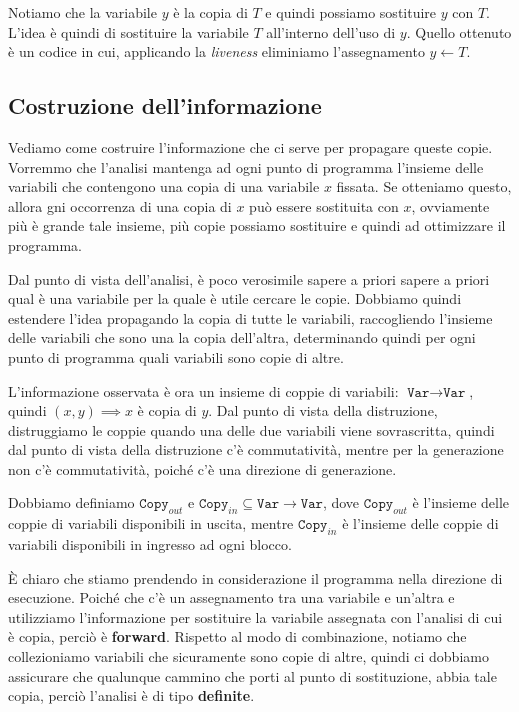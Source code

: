 Notiamo che la variabile $y$ è la copia di $T$ e quindi possiamo sostituire $y$ con $T$.
L'idea è quindi di sostituire la variabile $T$ all'interno dell'uso di $y$. Quello ottenuto 
è un codice in cui, applicando la \textit{liveness} eliminiamo l'assegnamento $y \gets T$.
\subsection{Costruzione dell'informazione}
Vediamo come costruire l'informazione che ci serve per propagare queste copie.
Vorremmo che l'analisi mantenga ad ogni punto di programma l'insieme delle variabili che contengono 
una copia di una variabile $x$ fissata.
Se otteniamo questo, allora gni occorrenza di una copia di $x$ può essere sostituita con $x$, ovviamente 
più è grande tale insieme, più copie possiamo sostituire e quindi ad ottimizzare il programma.

Dal punto di vista dell'analisi, è poco verosimile sapere a priori sapere a priori qual è una variabile 
per la quale è utile cercare le copie. Dobbiamo quindi estendere l'idea propagando la copia di tutte le 
variabili, raccogliendo l'insieme delle variabili che sono una la copia dell'altra, determinando quindi
per ogni punto di programma quali variabili sono copie di altre.

L'informazione osservata è ora un insieme di coppie di variabili: $\texttt{Var} \rightarrow \texttt{Var}$, 
quindi $(x, y) \implies x$ è copia di $y$. Dal punto di vista della distruzione, distruggiamo le coppie 
quando una delle due variabili viene sovrascritta, quindi dal punto di vista della distruzione 
c'è commutatività, mentre per la generazione non c'è commutatività, poiché c'è una direzione di 
generazione.

Dobbiamo definiamo $\texttt{Copy}_{out}$ e $\texttt{Copy}_{in} \subseteq \texttt{Var} \rightarrow \texttt{Var}$, dove 
$\texttt{Copy}_{out}$ è l'insieme delle coppie di variabili disponibili in uscita,
mentre $\texttt{Copy}_{in}$ è l'insieme delle coppie di variabili disponibili in ingresso ad ogni blocco.

È chiaro che stiamo prendendo in considerazione il programma nella direzione di esecuzione. Poiché che 
c'è un assegnamento tra una variabile e un'altra e utilizziamo l'informazione per sostituire la variabile
assegnata con l'analisi di cui è copia, perciò è \textbf{forward}.
Rispetto al modo di combinazione, notiamo che collezioniamo variabili che sicuramente sono copie di altre,
quindi ci dobbiamo assicurare che qualunque cammino che porti al punto di sostituzione, abbia 
tale copia, perciò l'analisi è di tipo \textbf{definite}.

